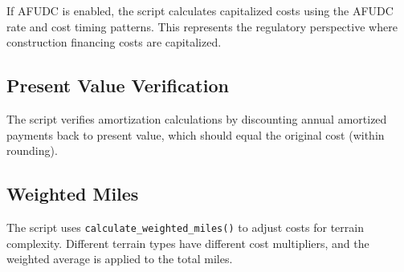 \documentclass[12pt]{article}
\begin{document}
If AFUDC is enabled, the script calculates capitalized costs using the AFUDC rate and cost timing patterns. This represents the regulatory perspective where construction financing costs are capitalized.

\subsection{Present Value Verification}

The script verifies amortization calculations by discounting annual amortized payments back to present value, which should equal the original cost (within rounding).

\subsection{Weighted Miles}

The script uses \texttt{calculate\_weighted\_miles()} to adjust costs for terrain complexity. Different terrain types have different cost multipliers, and the weighted average is applied to the total miles.
\end{document}
